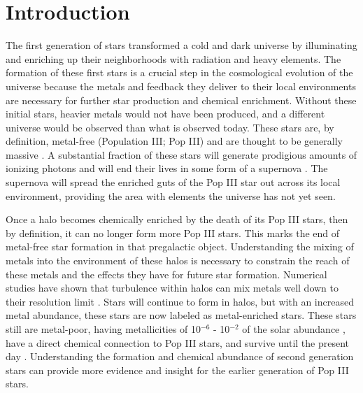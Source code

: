 \documentclass[a4paper,fleqn,usenatbib]{mnras}
\begin{document}
\section{Introduction}

The first generation of stars transformed a cold and dark universe
by illuminating and enriching up their neighborhoods with radiation
and heavy elements. The formation of these first stars is a crucial step in the cosmological evolution of the universe because the metals and feedback they deliver to their local environments are necessary for further star production and chemical enrichment. Without these initial stars, heavier metals would not have been produced, and a different universe would be observed than what is observed today. These stars are, by definition, metal-free (Population III; Pop III) and are thought to be generally massive \citep{ABN02, Bromm02_P3, Turk09, Hosokawa11, Hosokawa16, Hirano15}. A substantial fraction of these stars will generate prodigious amounts of ionizing photons and will end their lives in some form of a supernova \citep[e.g.][]{Schaerer02, Heger02}. The supernova will spread the enriched guts of the Pop III star out across its local environment, providing the area with elements the universe has not yet seen. 

Once a halo becomes chemically enriched by the death of its Pop III stars, then by definition, it can no longer form more Pop III stars. This marks the end of metal-free star formation in that pregalactic object. Understanding the mixing of metals into the environment of these halos is necessary to constrain the reach of these metals and the effects they have for future star formation. Numerical studies have shown that turbulence within halos can mix metals well down to their resolution limit \citep[][and more]{Wise08_Gal, Greif10, Smith15}. Stars will continue to form in halos, but with an increased metal abundance, these stars are now labeled as metal-enriched stars. These stars still are metal-poor, having metallicities of 10$^{-6}$ - 10$^{-2}$ of the solar abundance \citep{Chiaki16, Chiaki18, Ritter16}, have a direct chemical connection to Pop III stars, and survive until the present day \citep{Gnedin06, Tumlinson10, Griffen18, Magg18}. Understanding the formation and chemical abundance of second generation stars can provide more evidence and insight for the earlier generation of Pop III stars.
\end{document}
